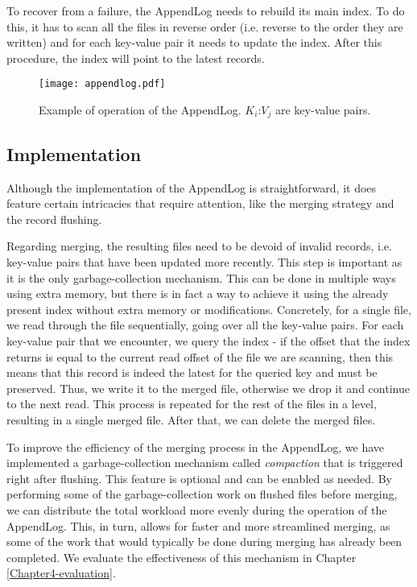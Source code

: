 To recover from a failure, the AppendLog needs to rebuild its main index. To do this, it has to scan all the files in reverse order (i.e. reverse to the order they are written) and for each key-value pair it needs to update the index. After this procedure, the index will point to the latest records.

\begin{figure}[h]
    \centering
    \texttt{[image: appendlog.pdf]}
    \caption{Example of operation of the AppendLog. $K_i$:$V_j$ are key-value pairs.}
    \label{fig:appendlog}
\end{figure}

\subsection{Implementation}
\label{appendlog-implementation}

Although the implementation of the AppendLog is straightforward, it does feature certain intricacies that require attention, like the merging strategy and the record flushing.

Regarding merging, the resulting files need to be devoid of invalid records, i.e. key-value pairs that have been updated more recently. This step is important as it is the only garbage-collection mechanism. This can be done in multiple ways using extra memory, but there is in fact a way to achieve it using the already present index without extra memory or modifications. Concretely, for a single file, we read through the file sequentially, going over all the key-value pairs. For each key-value pair that we encounter, we query the index - if the offset that the index returns is equal to the current read offset of the file we are scanning, then this means that this record is indeed the latest for the queried key and must be preserved. Thus, we write it to the merged file, otherwise we drop it and continue to the next read. This process is repeated for the rest of the files in a level, resulting in a single merged file. After that, we can delete the merged files.

To improve the efficiency of the merging process in the AppendLog, we have implemented a garbage-collection mechanism called \textit{compaction} that is triggered right after flushing. This feature is optional and can be enabled as needed. By performing some of the garbage-collection work on flushed files before merging, we can distribute the total workload more evenly during the operation of the AppendLog. This, in turn, allows for faster and more streamlined merging, as some of the work that would typically be done during merging has already been completed. We evaluate the effectiveness of this mechanism in Chapter \ref{Chapter4-evaluation}.


